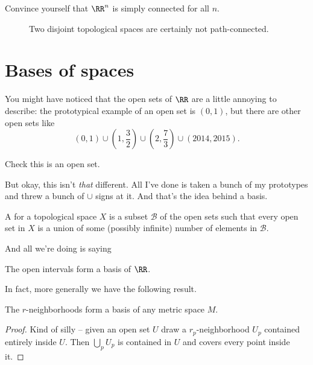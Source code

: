 \begin{ques}
	Convince yourself that $\RR^n$ is simply connected for all $n$.
\end{ques}

\begin{figure}[ht]
	\centering
	\caption{Two disjoint topological spaces are certainly not path-connected.}
\end{figure}

\section{Bases of spaces}

You might have noticed that the open sets of $\RR$ are a little annoying to describe:
the prototypical example of an open set is $(0,1)$,
but there are other open sets like
\[
	(0,1)
	\cup \left( 1, \frac32 \right)
	\cup \left( 2, \frac 73 \right)
	\cup (2014, 2015). \]
\begin{ques}
	Check this is an open set.
\end{ques}

But okay, this isn't \emph{that} different.
All I've done is taken a bunch of my prototypes and threw a bunch of $\cup$ signs at it.
And that's the idea behind a basis.

\begin{definition}
	A  for a topological space $X$
	is a subset $\mathcal B$ of the open sets
	such that every open set in $X$
	is a union of some (possibly infinite) number of elements in
	$\mathcal B$.
\end{definition}

And all we're doing is saying
\begin{example}[Basis of $\RR$]
	The open intervals form a basis of $\RR$.
\end{example}
In fact, more generally we have the following result.
\begin{theorem}
	The $r$-neighborhoods form a basis of any metric space $M$.
\end{theorem}
\begin{proof}
	Kind of silly -- given an open set $U$
	draw a $r_p$-neighborhood $U_p$ contained entirely inside $U$.
	Then $\bigcup_p U_p$ is contained in $U$ and covers
	every point inside it.
\end{proof}

